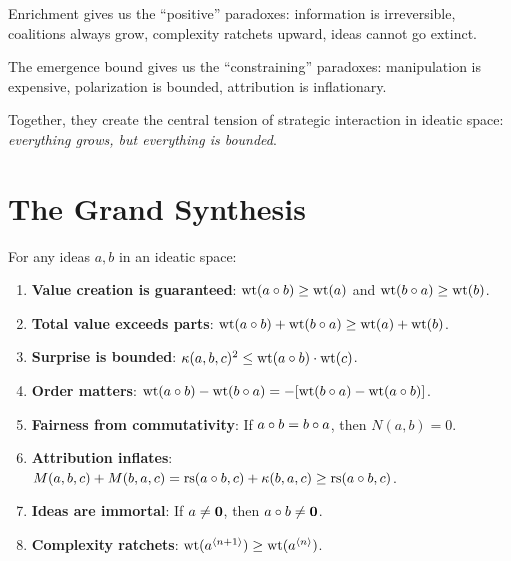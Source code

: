 Enrichment gives us the ``positive'' paradoxes: information is irreversible, coalitions always grow, complexity ratchets upward, ideas cannot go extinct.

The emergence bound gives us the ``constraining'' paradoxes: manipulation is expensive, polarization is bounded, attribution is inflationary.

Together, they create the central tension of strategic interaction in ideatic space: \emph{everything grows, but everything is bounded}.

\section{The Grand Synthesis}

\begin{theorem}
\label{thm:fundamental}
For any ideas $a, b$ in an ideatic space:
\begin{enumerate}
\item \textbf{Value creation is guaranteed}: $\operatorname{wt}(a \circ b) \geq \operatorname{wt}(a)$ and $\operatorname{wt}(b \circ a) \geq \operatorname{wt}(b)$.
\item \textbf{Total value exceeds parts}: $\operatorname{wt}(a \circ b) + \operatorname{wt}(b \circ a) \geq \operatorname{wt}(a) + \operatorname{wt}(b)$.
\item \textbf{Surprise is bounded}: $\kappa(a,b,c)^2 \leq \operatorname{wt}(a \circ b) \cdot \operatorname{wt}(c)$.
\item \textbf{Order matters}: $\operatorname{wt}(a \circ b) - \operatorname{wt}(b \circ a) = -[\operatorname{wt}(b \circ a) - \operatorname{wt}(a \circ b)]$.
\item \textbf{Fairness from commutativity}: If $a \circ b = b \circ a$, then $N(a,b) = 0$.
\item \textbf{Attribution inflates}: $M(a,b,c) + M(b,a,c) = \operatorname{rs}(a \circ b, c) + \kappa(b,a,c) \geq \operatorname{rs}(a \circ b, c)$.
\item \textbf{Ideas are immortal}: If $a \neq \mathbf{0}$, then $a \circ b \neq \mathbf{0}$.
\item \textbf{Complexity ratchets}: $\operatorname{wt}(a^{\langle n+1 \rangle}) \geq \operatorname{wt}(a^{\langle n \rangle})$.
\end{enumerate}
\end{theorem}

